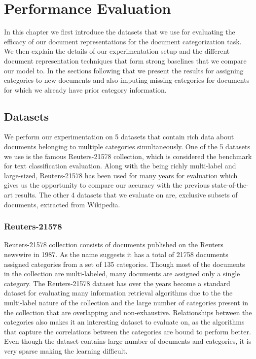 \chapter{Performance Evaluation}
\label{chapter:evaluations}
In this chapter we first introduce the datasets that we use for evaluating the efficacy of our document representations for the document categorization task. We then explain the details of our experimentation setup and the different document representation techniques that form strong baselines that we compare our model to. In the sections following that we present the results for assigning categories to new documents and also imputing missing categories for documents for which we already have prior category information. 

\section{Datasets}
We perform our experimentation on 5 datasets that contain rich data about documents belonging to multiple categories simultaneously. One of the 5 datasets we use is the famous Reuters-21578 collection, which is considered the benchmark for text classification evaluation. Along with the being richly multi-label and large-sized, Reuters-21578 has been used for many years for evaluation which gives us the opportunity to compare our accuracy with the previous state-of-the-art results. The other 4 datasets that we evaluate on are, exclusive subsets of documents, extracted from Wikipedia.


\subsection{Reuters-21578}
Reuters-21578 collection consists of documents published on the Reuters newswire in 1987. As the name suggests it has a total of 21758 documents assigned categories from a set of 135 categories. Though most of the documents in the collection are multi-labeled, many documents are assigned only a single category. The Reuters-21578 dataset has over the years become a standard dataset for evaluating many information retrieval algorithms due to the the multi-label nature of the collection and the large number of categories present in the collection that are overlapping and non-exhaustive. Relationships between the categories also makes it an interesting dataset to evaluate on, as the algorithms that capture the correlations between the categories are bound to perform better. Even though the dataset contains large number of documents and categories, it is very sparse making the learning difficult.

